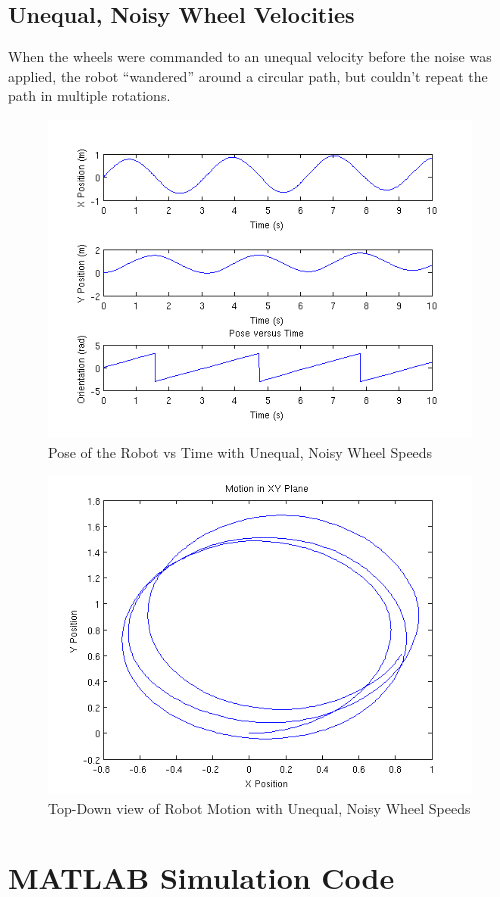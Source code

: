 \documentclass[10pt]{amsart}
\begin{document}
\newpage
\subsection{Unequal, Noisy Wheel Velocities}
When the wheels were commanded to an unequal velocity before the noise was applied, the robot ``wandered'' around a circular path, but couldn't repeat the path in multiple rotations.

\begin{figure}[h]
 \centering
 \includegraphics[scale=0.5,keepaspectratio=true]{unequalnoisepose.png}
 \caption{Pose of the Robot vs Time with Unequal, Noisy Wheel Speeds}
 \label{fig:unequalnoisepose}
\end{figure}

\begin{figure}[h]
 \centering
 \includegraphics[scale=0.5,keepaspectratio=true]{unequalnoiseplane.png}
 \caption{Top-Down view of Robot Motion with Unequal, Noisy Wheel Speeds}
 \label{fig:unequalnoiseplane}
\end{figure}

\newpage
\section{MATLAB Simulation Code}


\end{document}

